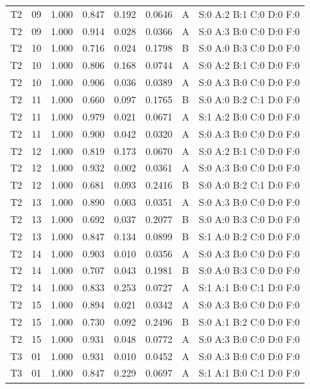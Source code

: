 \begin{longtable}{lrrrrrll}
T2 & 09 & 1.000 & 0.847 & 0.192 & 0.0646 & A & \tiny S:0 A:2 B:1 C:0 D:0 F:0 \\
T2 & 09 & 1.000 & 0.914 & 0.028 & 0.0366 & A & \tiny S:0 A:3 B:0 C:0 D:0 F:0 \\
T2 & 10 & 1.000 & 0.716 & 0.024 & 0.1798 & B & \tiny S:0 A:0 B:3 C:0 D:0 F:0 \\
T2 & 10 & 1.000 & 0.806 & 0.168 & 0.0744 & A & \tiny S:0 A:2 B:1 C:0 D:0 F:0 \\
T2 & 10 & 1.000 & 0.906 & 0.036 & 0.0389 & A & \tiny S:0 A:3 B:0 C:0 D:0 F:0 \\
T2 & 11 & 1.000 & 0.660 & 0.097 & 0.1765 & B & \tiny S:0 A:0 B:2 C:1 D:0 F:0 \\
T2 & 11 & 1.000 & 0.979 & 0.021 & 0.0671 & A & \tiny S:1 A:2 B:0 C:0 D:0 F:0 \\
T2 & 11 & 1.000 & 0.900 & 0.042 & 0.0320 & A & \tiny S:0 A:3 B:0 C:0 D:0 F:0 \\
T2 & 12 & 1.000 & 0.819 & 0.173 & 0.0670 & A & \tiny S:0 A:2 B:1 C:0 D:0 F:0 \\
T2 & 12 & 1.000 & 0.932 & 0.002 & 0.0361 & A & \tiny S:0 A:3 B:0 C:0 D:0 F:0 \\
T2 & 12 & 1.000 & 0.681 & 0.093 & 0.2416 & B & \tiny S:0 A:0 B:2 C:1 D:0 F:0 \\
T2 & 13 & 1.000 & 0.890 & 0.003 & 0.0351 & A & \tiny S:0 A:3 B:0 C:0 D:0 F:0 \\
T2 & 13 & 1.000 & 0.692 & 0.037 & 0.2077 & B & \tiny S:0 A:0 B:3 C:0 D:0 F:0 \\
T2 & 13 & 1.000 & 0.847 & 0.134 & 0.0899 & B & \tiny S:1 A:0 B:2 C:0 D:0 F:0 \\
T2 & 14 & 1.000 & 0.903 & 0.010 & 0.0356 & A & \tiny S:0 A:3 B:0 C:0 D:0 F:0 \\
T2 & 14 & 1.000 & 0.707 & 0.043 & 0.1981 & B & \tiny S:0 A:0 B:3 C:0 D:0 F:0 \\
T2 & 14 & 1.000 & 0.833 & 0.253 & 0.0727 & A & \tiny S:1 A:1 B:0 C:1 D:0 F:0 \\
T2 & 15 & 1.000 & 0.894 & 0.021 & 0.0342 & A & \tiny S:0 A:3 B:0 C:0 D:0 F:0 \\
T2 & 15 & 1.000 & 0.730 & 0.092 & 0.2496 & B & \tiny S:0 A:1 B:2 C:0 D:0 F:0 \\
T2 & 15 & 1.000 & 0.931 & 0.048 & 0.0772 & A & \tiny S:0 A:3 B:0 C:0 D:0 F:0 \\
T3 & 01 & 1.000 & 0.931 & 0.010 & 0.0452 & A & \tiny S:0 A:3 B:0 C:0 D:0 F:0 \\
T3 & 01 & 1.000 & 0.847 & 0.229 & 0.0697 & A & \tiny S:1 A:1 B:0 C:1 D:0 F:0 \\

\end{longtable}
